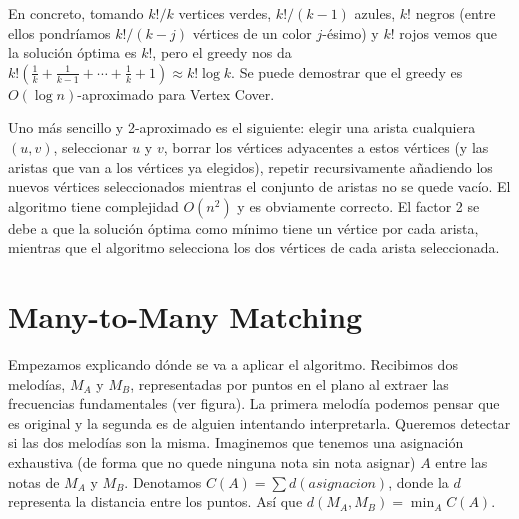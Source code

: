 \documentclass[AL.tex]{subfiles}
\begin{document}
\begin{ej}
En concreto, tomando $k!/k$ vertices verdes, $k!/(k-1)$ azules, $k!$ negros (entre ellos pondríamos $k!/(k-j)$ vértices de un color $j$-ésimo) y $k!$ rojos vemos que la solución óptima es $k!$, pero el greedy nos da $k!\left(\frac{1}{k}+\frac{1}{k-1}+\cdots +\frac{1}{k}+1\right)\approx k!\log k$. Se puede demostrar que el greedy es $O(\log n)$-aproximado para Vertex Cover. 

Uno más sencillo y 2-aproximado es el siguiente: elegir una arista cualquiera $(u,v)$, seleccionar $u$ y $v$, borrar los vértices adyacentes a estos vértices (y las aristas que van a los vértices ya elegidos), repetir recursivamente añadiendo los nuevos vértices seleccionados mientras el conjunto de aristas no se quede vacío. El algoritmo tiene complejidad $O(n^2)$ y es obviamente correcto. El factor 2 se debe a que la solución óptima como mínimo tiene un vértice por cada arista, mientras que el algoritmo selecciona los dos vértices de cada arista seleccionada. 
\end{ej}

\section{Many-to-Many Matching}
Empezamos explicando dónde se va a aplicar el algoritmo. Recibimos dos melodías, $M_A$ y $M_B$, representadas por puntos en el plano al extraer las frecuencias fundamentales (ver figura). La primera melodía podemos pensar que es original y la segunda es de alguien intentando interpretarla. Queremos detectar si las dos melodías son la misma. Imaginemos que tenemos una asignación exhaustiva (de forma que no quede ninguna nota sin nota asignar) $A$ entre las notas de $M_A$ y $M_B$. Denotamos $C(A)=\sum d(asignacion)$, donde la $d$ representa la distancia entre los puntos. Así que $d(M_A,M_B)=\min_A C(A)$.
\end{document}
